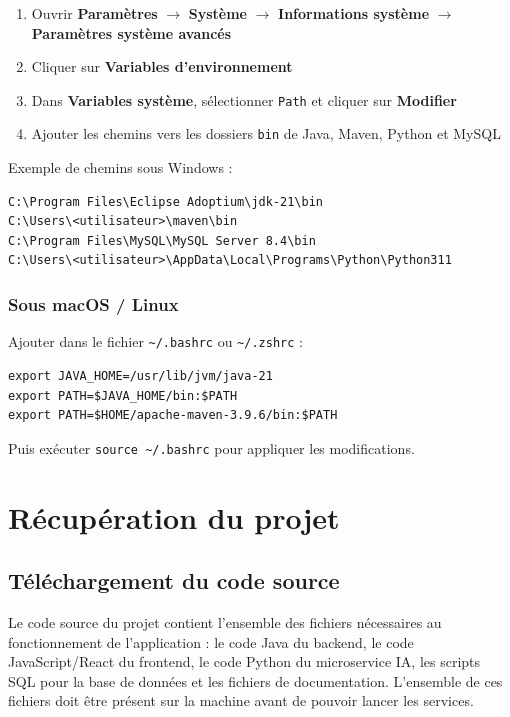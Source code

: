 \documentclass[12pt,a4paper]{report}
\begin{document}
\begin{enumerate}
    \item Ouvrir \textbf{Paramètres} $\rightarrow$ \textbf{Système} $\rightarrow$ \textbf{Informations système} $\rightarrow$ \textbf{Paramètres système avancés}
    \item Cliquer sur \textbf{Variables d'environnement}
    \item Dans \textbf{Variables système}, sélectionner \texttt{Path} et cliquer sur \textbf{Modifier}
    \item Ajouter les chemins vers les dossiers \texttt{bin} de Java, Maven, Python et MySQL
\end{enumerate}

Exemple de chemins sous Windows :
\begin{verbatim}
C:\Program Files\Eclipse Adoptium\jdk-21\bin
C:\Users\<utilisateur>\maven\bin
C:\Program Files\MySQL\MySQL Server 8.4\bin
C:\Users\<utilisateur>\AppData\Local\Programs\Python\Python311
\end{verbatim}

\subsection{Sous macOS / Linux}

Ajouter dans le fichier \texttt{\textasciitilde/.bashrc} ou \texttt{\textasciitilde/.zshrc} :
\begin{verbatim}
export JAVA_HOME=/usr/lib/jvm/java-21
export PATH=$JAVA_HOME/bin:$PATH
export PATH=$HOME/apache-maven-3.9.6/bin:$PATH
\end{verbatim}

Puis exécuter \texttt{source \textasciitilde/.bashrc} pour appliquer les modifications.

\chapter{Récupération du projet}

\section{Téléchargement du code source}

Le code source du projet contient l'ensemble des fichiers nécessaires au fonctionnement de l'application : le code Java du backend, le code JavaScript/React du frontend, le code Python du microservice IA, les scripts SQL pour la base de données et les fichiers de documentation. L'ensemble de ces fichiers doit être présent sur la machine avant de pouvoir lancer les services.
\end{document}

